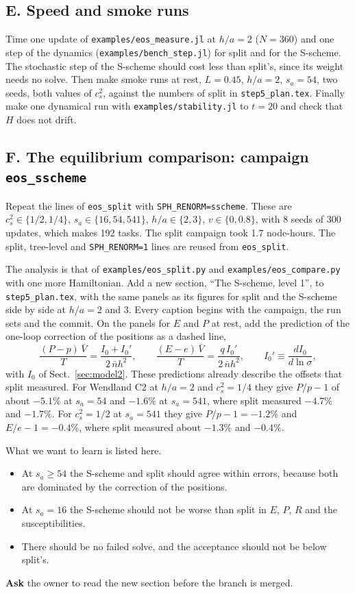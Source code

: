 \documentclass[11pt,aps,preprint,nofootinbib,superscriptaddress,tightenlines]{revtex4-2}
\def\st{\begin{equation}}
\def\stp{\end{equation}}
\def\Sect#1{Sect.~\ref{#1}}
\begin{document}
\subsection{E. Speed and smoke runs}

Time one update of \nolinkurl{examples/eos_measure.jl} at $h/a=2$ ($N=360$) and one step of the dynamics (\nolinkurl{examples/bench_step.jl}) for
split and for the S-scheme.  The stochastic step of the S-scheme should cost less than split's, since its weight needs no solve.  Then make smoke
runs at rest, $L=0.45$, $h/a=2$, $s_a=54$, two seeds, both values of $c_s^2$, against the numbers of split in \nolinkurl{step5_plan.tex}.  Finally make
one dynamical run with \nolinkurl{examples/stability.jl} to $t=20$ and check that $H$ does not drift.

\subsection{F. The equilibrium comparison: campaign \texttt{eos\_sscheme}}

Repeat the lines of \texttt{eos\_split} with \texttt{SPH\_RENORM=sscheme}.  These are $c_s^2\in\{1/2,1/4\}$, $s_a\in\{16,54,541\}$, $h/a\in\{2,3\}$,
$v\in\{0,0.8\}$, with 8 seeds of 300 updates, which makes 192 tasks.  The split campaign took 1.7 node-hours.  The split, tree-level and
\texttt{SPH\_RENORM=1} lines are reused from \texttt{eos\_split}.

The analysis is that of \nolinkurl{examples/eos_split.py} and \nolinkurl{examples/eos_compare.py} with one more Hamiltonian.  Add a new section,
``The S-scheme, level 1'', to \nolinkurl{step5_plan.tex}, with the same panels as its figures for split and the S-scheme side by side at $h/a=2$ and $3$.
Every caption begins with the campaign, the run sets and the commit.  On the panels for $E$ and $P$ at rest, add the prediction of the one-loop
correction of the positions as a dashed line,
\st
\frac{(P-p)\,\bar V}{T}=\frac{I_0+I_0'}{2\,\bar nh^2},\qquad \frac{(E-e)\,\bar V}{T}=\frac{q\,I_0'}{2\,\bar nh^2},\qquad I_0'\equiv\frac{dI_0}{d\ln\sigma} ,
\label{loopPE}
\stp
with $I_0$ of \Sect{sec:model2}.  These predictions already describe the offsets that split measured.  For Wendland C2 at $h/a=2$ and $c_s^2=1/4$ they
give $P/p-1$ of about $-5.1\%$ at $s_a=54$ and $-1.6\%$ at $s_a=541$, where split measured $-4.7\%$ and $-1.7\%$.  For $c_s^2=1/2$ at $s_a=541$ they give
$P/p-1=-1.2\%$ and $E/e-1=-0.4\%$, where split measured about $-1.3\%$ and $-0.4\%$.

What we want to learn is listed here.
\begin{itemize}
\item At $s_a\ge54$ the S-scheme and split should agree within errors, because both are dominated by the correction of the positions.
\item At $s_a=16$ the S-scheme should not be worse than split in $E$, $P$, $R$ and the susceptibilities.
\item There should be no failed solve, and the acceptance should not be below split's.
\end{itemize}
\textbf{Ask} the owner to read the new section before the branch is merged.
\end{document}
